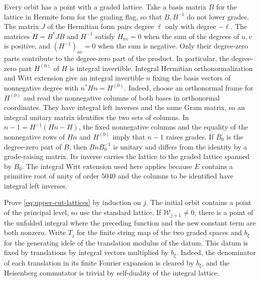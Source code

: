 Every orbit has a point with a graded lattice.
Take a basis matrix \(B\) for the lattice in Hermite form for
the grading flag, so that \(B,B^{-1}\) do not lower grades.
The matrix \(J\) of the Hermitian form pairs degree \(\ell\)
only with degree \(-\ell\). The matrices \(H=B^\ast J B\) and
\(H^{-1}\) satisfy \(H_{uv}=0\) when the sum of the degrees of
\(u,v\) is positive, and \((H^{-1})_{uv}=0\) when the sum is negative.
Only their degree-zero parts contribute to the degree-zero part
of the product. In particular, the degree-zero part \(H^{(0)}\) of
\(H\) is integral invertible. Integral Hermitian orthonormalization and Witt
extension give an integral invertible \(n\) fixing the basis
vectors of nonnegative degree with \(n^\ast H n=H^{(0)}\).
Indeed, choose an orthonormal frame for \(H^{(0)}\) and read the
nonnegative columns of both bases in orthonormal coordinates.
They have integral left inverses and the same Gram matrix,
so an integral unitary matrix identifies the two sets of columns.
In \(n-1=H^{-1}(Hn-H)\), the fixed nonnegative columns and the
equality of the nonnegative rows of \(Hn\) and \(H^{(0)}\) imply that
\(n-1\) raises grades. If \(B_0\) is the degree-zero part of \(B\),
then \(BnB_0^{-1}\) is unitary and differs from the identity by a
grade-raising matrix. Its inverse carries the lattice to the
graded lattice spanned by \(B_0\).
The integral Witt extension used here applies because \(E\)
contains a primitive root of unity of order \(5040\) and the
columns to be identified have integral left inverses.

Prove \eqref{eq:upper-cut-lattices} by induction on \(j\).
The initial orbit contains a point of the principal level,
so use the standard lattice. If \(\mathcal W_{j+1}\ne0\), there
is a point of the unfolded integral where the preceding function
and the new constant term are both nonzero.
Write \(T_j\) for the finite string map of the two graded spaces
and \(b_\xi\) for the generating idele of the translation modulus
of the datum. This datum is fixed by translations by integral
vectors multiplied by \(b_\xi\).
Indeed, the denominator of each translation in its finite Fourier
expansion is cleared by \(\overline b_\xi\), and the Heisenberg
commutator is trivial by self-duality of the integral lattice.

